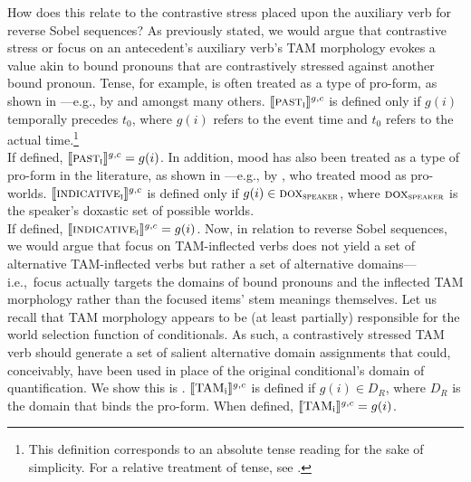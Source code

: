 How does this relate to the contrastive stress placed upon the auxiliary verb for reverse Sobel sequences? As previously stated, we would argue that contrastive stress or focus on an antecedent's auxiliary verb's TAM morphology evokes a value akin to bound pronouns that are contrastively stressed against another bound pronoun. Tense, for example, is often treated as a type of pro-form, as shown in ---e.g., by \textcite{Partee1973} and \textcite{Kratzer1998} amongst many others.
\ex{} 
$\intension[g,c]{\scshape past\textsubscript{i}}$ is defined only if $g(i)$ temporally precedes $t_0$, where $g(i)$ refers to the event time and $t_0$ refers to the actual time.\footnote{This definition corresponds to an absolute tense reading for the sake of simplicity. For a relative treatment of tense, see \textcite{Kusumoto1999}.}\\If defined, $\intension[g,c]{\scshape past\textsubscript{i}}=g(i)$\hfill\parencite[adapted from][p.~378]{Romero2017}.
\xe
In addition, mood has also been treated as a type of pro-form in the literature, as shown in ---e.g., by \textcite{Schlenker2004,Schlenker2005}, who treated mood as pro-worlds.
\ex{}
$\intension[g,c]{\scshape indicative\textsubscript{i}}$ is defined only if $g(i)\in\predicate{dox\textsubscript{speaker}}$, where $\predicate{dox\textsubscript{speaker}}$ is the speaker's doxastic set of possible worlds.\\If defined, $\intension[g,c]{\scshape indicative\textsubscript{i}}=g(i)$\hfill\parencite[adapted from][p.~379]{Romero2017}.
\xe
Now, in relation to reverse Sobel sequences, we would argue that focus on TAM-inflected verbs does not yield a set of alternative TAM-inflected verbs but rather a set of alternative domains---i.e.,~focus actually targets the domains of bound pronouns and the inflected TAM morphology rather than the focused items' stem meanings themselves. %
Let us recall that TAM morphology appears to be (at least partially) responsible for the world selection function of conditionals. As such, a contrastively stressed TAM verb should generate a set of salient alternative domain assignments that could, conceivably, have been used in place of the original conditional's domain of quantification. We show this is .
\pex[nopreamble=true]\label{def:tam}%
\a{} $\intension[g,c]{TAM\textsubscript{i}}$ is defined if $g(i)\in{D_R}$, where $D_R$ is the domain that binds the pro-form. When defined, $\intension[g,c]{TAM\textsubscript{i}}=g(i)$.
